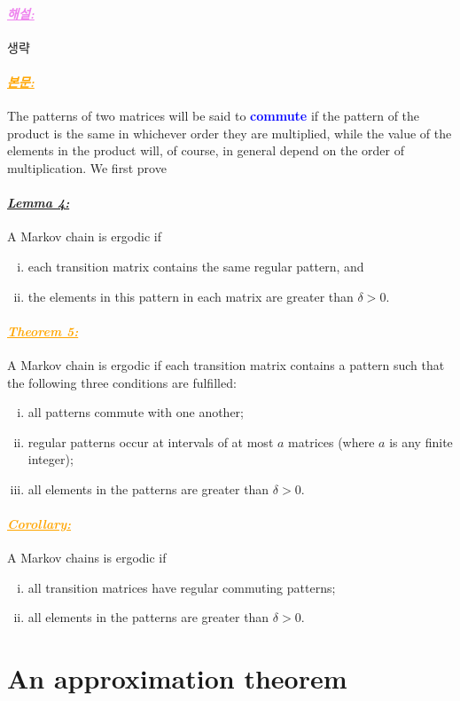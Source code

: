\documentclass[12pt,oneside,english,a4paper]{article}
\newcommand{\para}[1]{\paragraph{\LARGE\it\underline{\textbf{#1:}}}\LARGE}
\newcommand{\paraviolet}[1]{\paragraph{\LARGE\textcolor{violet}{\it\underline{\textbf{#1:}}}}\LARGE}
\newcommand{\paraorange}[1]{\paragraph{\LARGE\textcolor{orange}{\it\underline{\textbf{#1:}}}}\LARGE}
\begin{document}
\paraviolet{해설} 생략 

\paraorange{본문} The patterns of two matrices will be said to \textcolor{blue}{\bf commute} if the pattern of the product is the same in whichever order they are multiplied, while the value of the elements in
the product will, of course, in general depend on the order of multiplication. We first prove

\para{Lemma 4} A Markov chain is ergodic if 
\begin{enumerate}[(i)]
	\item each transition matrix contains the same regular pattern, and 
	\item the elements in this pattern in each matrix are greater than $\delta>0$.
\end{enumerate}

\paraorange{Theorem 5} A Markov chain is ergodic if each transition matrix contains a pattern such that the following three conditions are fulfilled: 
\begin{enumerate}[(i)]
\item all patterns commute with one another; 
\item regular patterns occur at intervals of at most $a$ matrices (where $a$ is any finite integer); 
\item all elements in the patterns are greater than $\delta>0$.
\end{enumerate}

\paraorange{Corollary} A Markov chains is ergodic if 
\begin{enumerate}[(i)]
	\item all transition matrices have regular commuting patterns; 
	\item all elements in the patterns are greater than $\delta>0$. 
\end{enumerate}

\section{An approximation theorem} 
\end{document}
